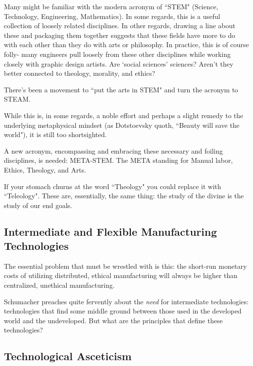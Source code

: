 \documentclass[letterpaper]{article}
\begin{document}
Many might be familiar with the modern acronym of ``STEM" (Science, Technology, Engineering, Mathematics). In some regards, this is a useful collection of loosely related disciplines. In other regards, drawing a line about these and packaging them together suggests that these fields have more to do with each other than they do with arts or philosophy. In practice, this is of course folly- many engineers pull loosely from these other disciplines while working closely with graphic design artists. Are `social sciences' sciences? Aren't they better connected to theology, morality, and ethics?

There's been a movement to ``put the arts in STEM" and turn the acronym to STEAM.

While this is, in some regards, a noble effort and perhaps a slight remedy to the underlying metaphysical mindset (as Dotstoevsky quoth, ``Beauty will save the world"), it is still too shortsighted.

A new acronym, encompassing and embracing these necessary and foiling disciplines, is needed: META-STEM. The META standing for Manual labor, Ethics, Theology, and Arts.

If your stomach churns at the word ``Theology" you could replace it with ``Teleology". These are, essentially, the same thing: the study of the divine is the study of our end goals.

\subsection{Intermediate and Flexible Manufacturing Technologies}

The essential problem that must be wrestled with is this: the short-run monetary costs of utilizing distributed, ethical manufacturing will always be higher than centralized, unethical manufacturing.

Schumacher preaches quite fervently about the \textit{need} for intermediate technologies: technologies that find some middle ground between those used in the developed world and the undeveloped. But what are the principles that define these technologies?

\subsection{Technological Asceticism}
\fi
\end{document}
